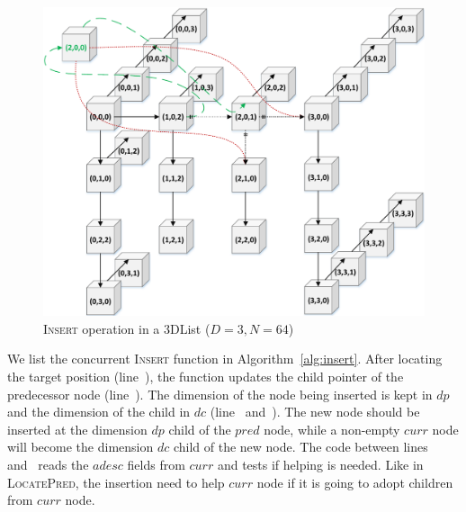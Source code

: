 \documentclass[10pt,conference,compsocconf]{IEEEtran}
\begin{document}
\begin{figure}[t]
    \centering
    \includegraphics[width=1\columnwidth]{./graph/mdlist-3d-ins}
    \caption{\textsc{Insert} operation in a 3DList ($D=3,N=64$)}
    \label{fig:mdlist3dins}
    \vspace{-0.22in}
\end{figure}

We list the concurrent \textsc{Insert} function in Algorithm~\ref{alg:insert}.
After locating the target position (line~), the function updates the child pointer of the predecessor node (line~).
The dimension of the node being inserted is kept in $dp$ and the dimension of the child in $dc$ (line~ and~).
The new node should be inserted at the dimension $dp$ child of the $pred$ node, while a non-empty $curr$ node will become the dimension $dc$ child of the new node.
The code between lines~ and~ reads the $adesc$ fields from $curr$ and tests if helping is needed.
Like in \textsc{LocatePred}, the insertion need to help $curr$ node if it is going to adopt children from $curr$ node.
\end{document}
